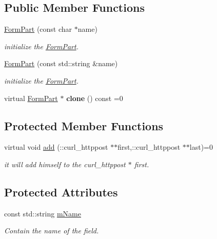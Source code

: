 \subsection*{Public Member Functions}
\begin{DoxyCompactItemize}
\item 
\hyperlink{classcurlpp_1_1FormPart_a25c51c604a32d82d23d2955bb19e2e63}{Form\-Part} (const char $\ast$name)
\begin{DoxyCompactList}\small\item\em initialize the \hyperlink{classcurlpp_1_1FormPart}{Form\-Part}. \end{DoxyCompactList}\item 
\hyperlink{classcurlpp_1_1FormPart_a839ac0adc867bf96ef0b764d8d216850}{Form\-Part} (const std\-::string \&name)
\begin{DoxyCompactList}\small\item\em initialize the \hyperlink{classcurlpp_1_1FormPart}{Form\-Part}. \end{DoxyCompactList}\item 
\hypertarget{classcurlpp_1_1FormPart_a6005cbed5b7e266e280b489bba26e4d1}{virtual \hyperlink{classcurlpp_1_1FormPart}{Form\-Part} $\ast$ {\bfseries clone} () const =0}\label{classcurlpp_1_1FormPart_a6005cbed5b7e266e280b489bba26e4d1}

\end{DoxyCompactItemize}
\subsection*{Protected Member Functions}
\begin{DoxyCompactItemize}
\item 
\hypertarget{classcurlpp_1_1FormPart_ae4f52f30aa0ad2e4cf0a44e6a754b306}{virtual void \hyperlink{classcurlpp_1_1FormPart_ae4f52f30aa0ad2e4cf0a44e6a754b306}{add} (\-::curl\-\_\-httppost $\ast$$\ast$first,\-::curl\-\_\-httppost $\ast$$\ast$last)=0}\label{classcurlpp_1_1FormPart_ae4f52f30aa0ad2e4cf0a44e6a754b306}

\begin{DoxyCompactList}\small\item\em it will add himself to the curl\-\_\-httppost $\ast$ first. \end{DoxyCompactList}\end{DoxyCompactItemize}
\subsection*{Protected Attributes}
\begin{DoxyCompactItemize}
\item 
\hypertarget{classcurlpp_1_1FormPart_a7aa178e7bd1b9322c0a469705e0b6fe5}{const std\-::string \hyperlink{classcurlpp_1_1FormPart_a7aa178e7bd1b9322c0a469705e0b6fe5}{m\-Name}}\label{classcurlpp_1_1FormPart_a7aa178e7bd1b9322c0a469705e0b6fe5}

\begin{DoxyCompactList}\small\item\em Contain the name of the field. \end{DoxyCompactList}\end{DoxyCompactItemize}
